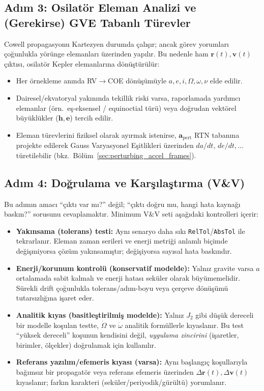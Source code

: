 \subsection{Adım 3: Osilatör Eleman Analizi ve (Gerekirse) GVE Tabanlı Türevler}
Cowell propagasyonu Kartezyen durumda çalışır; ancak görev yorumları çoğunlukla yörünge elemanları üzerinden yapılır.
Bu nedenle ham $\mathbf r(t),\mathbf v(t)$ çıktısı, osilatör Kepler elemanlarına dönüştürülür:
\begin{itemize}
    \item Her örnekleme anında RV$\rightarrow$COE dönüşümüyle $a,e,i,\Omega,\omega,\nu$ elde edilir.
    \item Dairesel/ekvatoryal yakınında tekillik riski varsa, raporlamada yardımcı elemanlar
    (örn.\ eş-eksensel / equinoctial türü) veya doğrudan vektörel büyüklükler ($\mathbf h,\mathbf e$) tercih edilir.
    \item Eleman türevlerini fiziksel olarak ayırmak istenirse, $\mathbf a_{\text{pert}}$ RTN tabanına projekte edilerek
    Gauss Varyasyonel Eşitlikleri üzerinden $da/dt,\,de/dt,\dots$ türetilebilir (bkz.\ Bölüm~\ref{sec:perturbing_accel_frames}).
\end{itemize}

\subsection{Adım 4: Doğrulama ve Karşılaştırma (V\&V)}
Bu adımın amacı ``çıktı var mı?'' değil; ``çıktı doğru mu, hangi hata kaynağı baskın?'' sorusunu cevaplamaktır.
Minimum V\&V seti aşağıdaki kontrolleri içerir:
\begin{itemize}
    \item \textbf{Yakınsama (tolerans) testi:} Aynı senaryo daha sıkı \texttt{RelTol}/\texttt{AbsTol} ile tekrarlanır.
    Eleman zaman serileri ve enerji metriği anlamlı biçimde değişmiyorsa çözüm yakınsamıştır; değişiyorsa sayısal hata baskındır.
    \item \textbf{Enerji/korunum kontrolü (konservatif modelde):} Yalnız gravite varsa $a$ ortalamada sabit kalmalı ve enerji
    hatası seküler olarak büyümemelidir. Sürekli drift çoğunlukla tolerans/adım-boyu veya çerçeve dönüşümü tutarsızlığına işaret eder.
    \item \textbf{Analitik kıyas (basitleştirilmiş modelde):} Yalnız $J_2$ gibi düşük dereceli bir modelle koşulan testte,
    $\dot{\Omega}$ ve $\dot{\omega}$ analitik formüllerle kıyaslanır. Bu test ``yüksek dereceli'' koşunun kendisini değil,
    \emph{uygulama zincirini} (işaretler, birimler, ölçekler) doğrulamak için kullanılır.
    \item \textbf{Referans yazılım/efemeris kıyası (varsa):} Aynı başlangıç koşullarıyla bağımsız bir propagatör veya referans
    efemeris üzerinden $\Delta\mathbf r(t),\Delta\mathbf v(t)$ kıyaslanır; farkın karakteri (seküler/periyodik/gürültü) yorumlanır.
\end{itemize}

